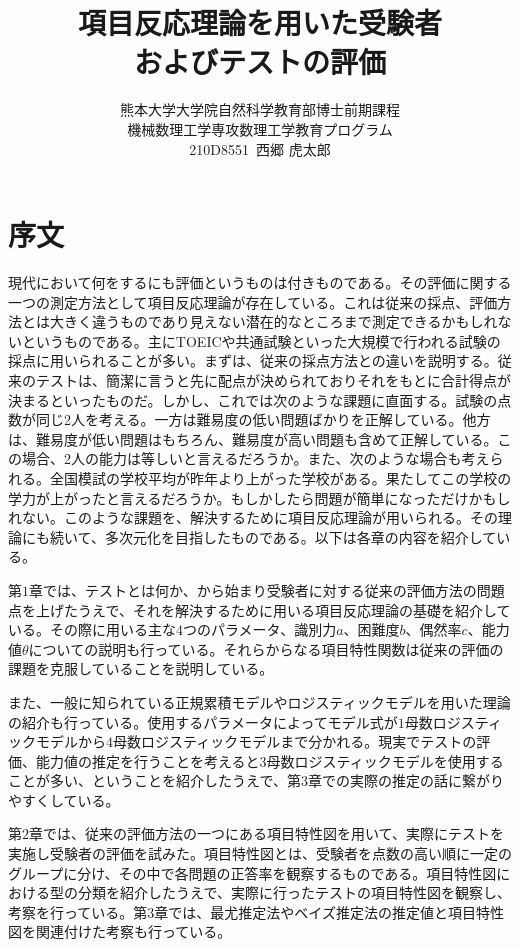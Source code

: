 \documentclass[12pt]{jarticle}
\title{項目反応理論を用いた受験者 \\ およびテストの評価}
\numberwithin{equation}{subsection}
\begin{document}
\date{}
\maketitle\thispagestyle{empty}
\vfill
\begin{center}
\author{熊本大学大学院自然科学教育部博士前期課程\\機械数理工学専攻数理工学教育プログラム\\210D8551\ 西郷 虎太郎}
\end{center}
\newpage
\section*{序文}
現代において何をするにも評価というものは付きものである。その評価に関する一つの測定方法として項目反応理論が存在している。これは従来の採点、評価方法とは大きく違うものであり見えない潜在的なところまで測定できるかもしれないというものである。主にTOEICや共通試験といった大規模で行われる試験の採点に用いられることが多い。まずは、従来の採点方法との違いを説明する。従来のテストは、簡潔に言うと先に配点が決められておりそれをもとに合計得点が決まるといったものだ。しかし、これでは次のような課題に直面する。試験の点数が同じ2人を考える。一方は難易度の低い問題ばかりを正解している。他方は、難易度が低い問題はもちろん、難易度が高い問題も含めて正解している。この場合、2人の能力は等しいと言えるだろうか。また、次のような場合も考えられる。全国模試の学校平均が昨年より上がった学校がある。果たしてこの学校の学力が上がったと言えるだろうか。もしかしたら問題が簡単になっただけかもしれない。このような課題を、解決するために項目反応理論が用いられる。その理論にも続いて、多次元化を目指したものである。以下は各章の内容を紹介している。

第$1$章では、テストとは何か、から始まり受験者に対する従来の評価方法の問題点を上げたうえで、それを解決するために用いる項目反応理論の基礎を紹介している。その際に用いる主な$4$つのパラメータ、識別力$a$、困難度$b$、偶然率$c$、能力値$\theta$についての説明も行っている。それらからなる項目特性関数は従来の評価の課題を克服していることを説明している。

また、一般に知られている正規累積モデルやロジスティックモデルを用いた理論の紹介も行っている。使用するパラメータによってモデル式が$1$母数ロジスティックモデルから$4$母数ロジスティックモデルまで分かれる。現実でテストの評価、能力値の推定を行うことを考えると$3$母数ロジスティックモデルを使用することが多い、ということを紹介したうえで、第$3$章での実際の推定の話に繋がりやすくしている。

第$2$章では、従来の評価方法の一つにある項目特性図を用いて、実際にテストを実施し受験者の評価を試みた。項目特性図とは、受験者を点数の高い順に一定のグループに分け、その中で各問題の正答率を観察するものである。項目特性図における型の分類を紹介したうえで、実際に行ったテストの項目特性図を観察し、考察を行っている。第$3$章では、最尤推定法やベイズ推定法の推定値と項目特性図を関連付けた考察も行っている。
\end{document}
